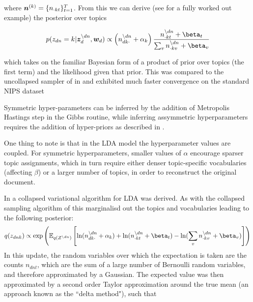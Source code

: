 where $\bm n^{(k)} = \{ n_{\cdot kt} \}_{t=1}^T$. From this we can derive (see \cite{Heinrich2005} for a fully worked out example) the posterior over topics

\begin{align}
p(z_{dn} = k | \vv{z}_{d}^{\setminus dn}, \vv{w}_d)
\propto
\left(n_{dk\cdot}^{\setminus dn} + \alpha_k \right)
\frac{n_{\cdot kt}^{\setminus dn} + \beta_t}{\sum_v n_{\cdot kv}^{\setminus dn} + \beta_v}
\end{align}

which takes on the familiar Bayesian form of a product of prior over topics (the first term) and the likelihood given that prior. This was compared to the uncollapsed sampler of \cite{Pritchard2000} in \cite{Newman2009} and exhibited much faster convergence on the standard NIPS dataset

Symmetric hyper-parameters can be inferred by the addition of Metropolis Hastings step in the Gibbs routine, while inferring assymmetric hyperparameters requires the addition of hyper-priors as described in \cite{Wallach2009a}. 

One thing to note is that in the LDA model the hyperparameter values are coupled. For symmetric hyperparameters, smaller values of $\alpha$ encourage sparser topic assignments, which in turn require either denser topic-specific vocabularies (affecting $\beta$) or a larger number of topics, in order to reconstruct the original document.

In \cite{Teh2007} a collapsed variational algorithm for LDA was derived. As with the collapsed sampling algorithm of \cite{Griffiths2004} this marginalisd out the topics and vocabularies leading to the following posterior:
\begin{equation}
q(\zdnk) \propto \exp\left(\ex{
    \ln (n_{dk\cdot}^{\setminus dn} + \alpha_k ) 
    + \ln (n_{\cdot kt}^{\setminus dn} + \beta_t)
    - \ln (\sum_v n_{\cdot kv}^{\setminus dn} + \beta_v)}{q(Z^{\setminus dn})}
\right)
\end{equation}
In this update, the random variables over which the expectation is taken are the counts $n_{dnt}$, which are the sum of a large number of Bernoulli random variables, and therefore approximated by a Gaussian. The expected value was then approximated by a second order Taylor approximation around the true mean (an approach known as the ``delta method"\cite{Wang2013}), such that

